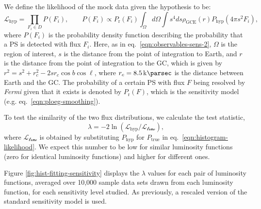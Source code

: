 \documentclass[letter,11pt]{article}
\begin{document}
We define the likelihood of the mock data given the hypothesis to be:
\begin{equation}
\mathcal{L}_\text{hyp}=\prod_{F_i\in D}P(F_i), \qquad P(F_i) \propto P_\text{r}(F_i)\int_\Omega d\Omega \int s^4 ds \rho_\text{GCE}(r) P_\text{hyp}(4\pi s^2 F_i),
\label{eqn:histogram-likelihood}
\end{equation}
where $P(F_i)$ is the probability density function describing the probability that a PS is detected with flux $F_i$. Here, as in eq.~\ref{eqn:observables-sens-2}, $\Omega$ is the region of interest, $s$ is the distance from the point of integration to Earth, and $r$ is the distance from the point of integration to the GC, which is given by $r^2=s^2+r_c^2-2sr_c\cos b \cos \ell$, where $r_c=\SI{8.5}{\kilo\parsec}$ is the distance between Earth and the GC. The probability of a certain PS with flux $F$ being resolved by \textit{Fermi} given that it exists is denoted by $P_\text{r}(F)$, which is the sensitivity model (e.g. eq.~\ref{eqn:ploeg-smoothing}).

To test the similarity of the two flux distributions, we calculate the test statistic,
\begin{equation}
\lambda=-2\ln(\mathcal{L}_\text{hyp}/\mathcal{L_\text{true}}),
\label{eqn:lambda}
\end{equation}
where $\mathcal{L_\text{true}}$ is obtained by substituting $P_\text{hyp}$ for $P_\text{true}$ in eq.~\ref{eqn:histogram-likelihood}. We expect this number to be low for similar luminosity functions (zero for identical luminosity functions) and higher for different ones.

Figure \ref{fig:hist-fitting-sensitivity} displays the $\lambda$ values for each pair of luminosity functions, averaged over 10,000 sample data sets drawn from each luminosity function, for each sensitivity level studied. As previously, a rescaled version of the standard sensitivity model is used.
\end{document}
